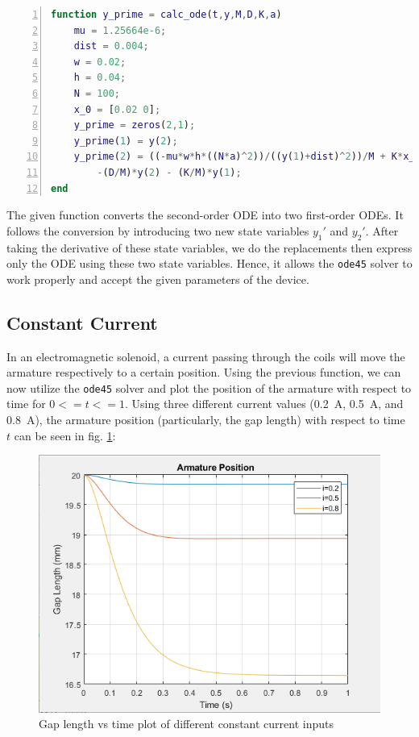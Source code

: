 \documentclass[conference]{IEEEtran}
\begin{document}
\begin{lstlisting}[language=matlab, numbers=left, xleftmargin=\parindent, caption=ODE function that models eqn. \eqref{ODE}]
function y_prime = calc_ode(t,y,M,D,K,a)
    mu = 1.25664e-6;
    dist = 0.004;
    w = 0.02;
    h = 0.04;
    N = 100;
    x_0 = [0.02 0];     
    y_prime = zeros(2,1);
    y_prime(1) = y(2);
    y_prime(2) = ((-mu*w*h*((N*a)^2))/((y(1)+dist)^2))/M + K*x_0(1)/M ... 
        -(D/M)*y(2) - (K/M)*y(1);  
end
\end{lstlisting}

The given function converts the second-order ODE into two first-order ODEs. It follows the conversion by introducing two new state variables $y_{1}'$ and $y_{2}'$. After taking the derivative of these state variables, we do the replacements then express only the ODE using these two state variables. Hence, it allows the \texttt{ode45} solver to work properly and accept the given parameters of the device.

\subsection{Constant Current}

In an electromagnetic solenoid, a current passing through the coils will move the armature respectively to a certain position. Using the previous function, we can now utilize the \texttt{ode45} solver and plot the position of the armature with respect to time for $0<=t<=1$. Using three different current values (\SI{0.2}{\ampere}, \SI{0.5}{\ampere}, and \SI{0.8}{\ampere}), the armature position (particularly, the gap length) with respect to time $t$ can be seen in fig. \ref{constcurrent}:

\begin{figure}
    \begin{centering}
    \includegraphics[width=\linewidth]{q2.png}
    \caption{Gap length vs time plot of different constant current inputs}
    \label{constcurrent}
    \end{centering}
\end{figure}
\end{document}
